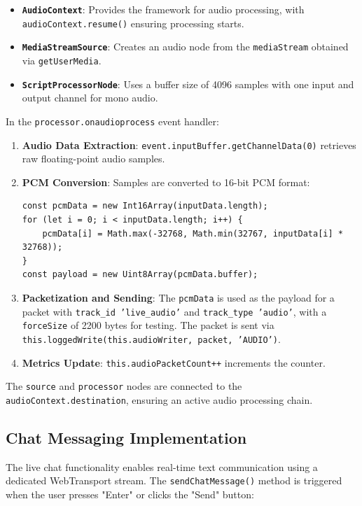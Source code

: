 \begin{itemize}
    \item \textbf{\texttt{AudioContext}}: Provides the framework for audio processing, with \texttt{audioContext.re\allowbreak{}sume()} ensuring processing starts.
    \item \textbf{\texttt{MediaStreamSource}}: Creates an audio node from the \texttt{mediaStream} obtained via \texttt{getUserMedia}.
    \item \textbf{\texttt{ScriptProcessorNode}}: Uses a buffer size of 4096 samples with one input and output channel for mono audio.
\end{itemize}

In the \texttt{processor.onaudioprocess} event handler:

\begin{enumerate}
    \item \textbf{Audio Data Extraction}: \texttt{event.inputBuffer.getChannelData(0)} retrieves raw floating-point audio samples.
    \item \textbf{PCM Conversion}: Samples are converted to 16-bit PCM format:
    \begin{lstlisting}[breaklines=true,basicstyle=\small\ttfamily,frame=single]
const pcmData = new Int16Array(inputData.length);
for (let i = 0; i < inputData.length; i++) {
    pcmData[i] = Math.max(-32768, Math.min(32767, inputData[i] * 32768));
}
const payload = new Uint8Array(pcmData.buffer);
    \end{lstlisting}
    \item \textbf{Packetization and Sending}: The \texttt{pcmData} is used as the payload for a packet with \texttt{track\_id 'live\_audio'} and \texttt{track\_type 'audio'}, with a \texttt{forceSize} of 2200 bytes for testing. The packet is sent via \texttt{this.loggedWrite(this.audioWriter, packet, 'AUDIO')}.
    \item \textbf{Metrics Update}: \texttt{this.audioPacketCount++} increments the counter.
\end{enumerate}

The \texttt{source} and \texttt{processor} nodes are connected to the \texttt{audioContext.destination}, ensuring an active audio processing chain.

\subsection{Chat Messaging Implementation}
The live chat functionality enables real-time text communication using a dedicated WebTransport stream. The \texttt{sendChatMessage()} method is triggered when the user presses "Enter" or clicks the "Send" button:

